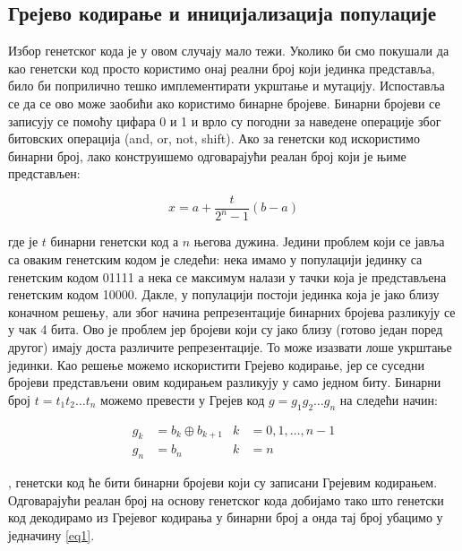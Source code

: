 \documentclass{article}
\begin{document}
\subsection{Грејево кодирање и иницијализација популације}
Избор генетског кода је у овом случају мало тежи. Уколико би смо покушали да као генетски код
просто користимо онај реални број који јединка представља, било би поприлично тешко 
имплементирати укрштање и мутацију. Испоставља се да се ово може заобићи ако користимо
бинарне бројеве. Бинарни бројеви се записују се помоћу цифара 0 и 1 и врло су погодни за 
наведене операције због битовских операција (and, or, not, shift). Ако за генетски код
искористимо бинарни број, лако конструишемо одговарајући реалан број који је њиме представљен:

\begin{equation} \label{eq1}
    x = a + \frac{t}{2^n - 1} (b - a)
\end{equation}

\noindent где је $t$ бинарни генетски код а $n$ његова дужина. Једини проблем који се јавља са оваким
генетским кодом је следећи: нека имамо у популацији јединку са генетским кодом 01111 а нека се максимум
налази у тачки која је представљена генетским кодом 10000. Дакле, у популацији постоји
јединка која је јако близу коначном решењу, али због начина репрезентације бинарних 
бројева разликују се у чак 4 бита. Ово је проблем јер бројеви који су јако близу 
(готово један поред другог) имају доста различите репрезентације. То може изазвати лоше укрштање јединки. 
Као решење можемо искористити Грејево кодирање, јер се суседни бројеви представљени овим кодирањем 
разликују у само једном биту. Бинарни број $t = t_1 t_2 \dots t_n$ можемо превести у 
Грејев код $g = g_1 g_2 \dots g_n$ на следећи начин: 

\begin{align*}
    g_k &= b_k \oplus b_{k + 1} & k &= 0, 1, \dots, n - 1 \\
    g_n &= b_n                   &   k &= n
\end{align*}

, генетски код ће бити бинарни бројеви који су записани Грејевим кодирањем. 
Одговарајући реалан број на основу генетског кода добијамо тако што генетски код 
декодирамо из Грејевог кодирања у бинарни број а онда тај број убацимо у једначину \ref*{eq1}.
\end{document}
